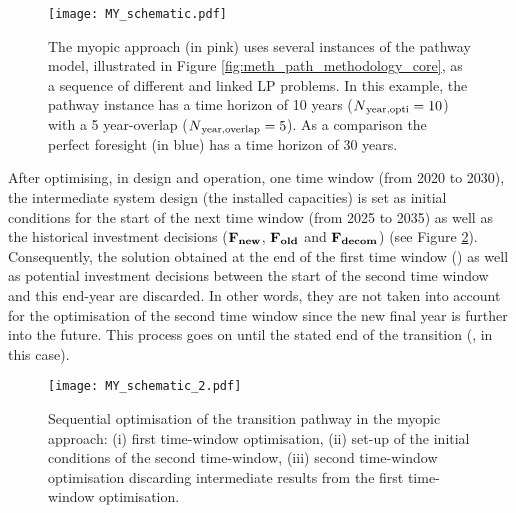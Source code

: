 \begin{figure}[htbp!]
\centering
\texttt{[image: MY\_schematic.pdf]}
\caption{The myopic approach (in pink) uses several instances of the pathway model, illustrated in Figure \ref{fig:meth_path_methodology_core}, as a sequence of different and linked \gls{LP} problems. In this example, the pathway instance has a time horizon of 10 years ($N\textsubscript{year,opti}=10$) with a 5 year-overlap ($N\textsubscript{year,overlap}=5$). As a comparison the perfect foresight (in blue) has a time horizon of 30 years.}
\label{fig:my_schematic}
\end{figure}

After optimising, in design and operation, one time window (\eg from 2020 to 2030), the intermediate system design (\ie the installed capacities) is set as initial conditions for the start of the next time window (\eg from 2025 to 2035) as well as the historical investment decisions (\ie $\textbf{F\textsubscript{new}}$, $\textbf{F\textsubscript{old}}$ and $\textbf{F\textsubscript{decom}}$) (see Figure \ref{fig:my_schematic_2}). Consequently, the solution obtained at the end of the first time window () as well as potential investment decisions between the start of the second time window and this end-year are discarded. In other words, they are not taken into account for the optimisation of the second time window since the new final year is further into the future. This process goes on until the stated end of the transition (, in this case).

\begin{figure}[htbp!]
\centering
\texttt{[image: MY\_schematic\_2.pdf]}
\caption{Sequential optimisation of the transition pathway in the myopic approach: (i) first time-window optimisation, (ii) set-up of the initial conditions of the second time-window, (iii) second time-window optimisation discarding intermediate results from the first time-window optimisation.}
\label{fig:my_schematic_2}
\end{figure}

\\

